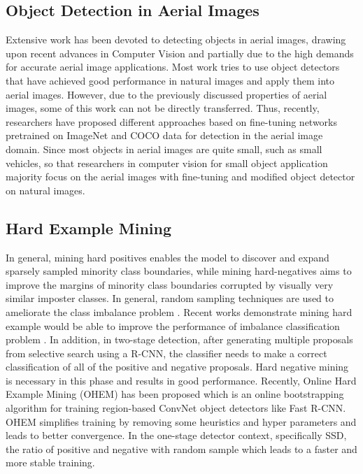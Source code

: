 \documentclass[conference]{IEEEtran}
\begin{document}
	\subsection{Object Detection in Aerial Images}
    Extensive work has been devoted to detecting objects in aerial images, drawing upon recent advances in Computer Vision and partially due to the  high demands for accurate aerial image applications. Most work tries to use object detectors that have achieved good performance in natural images and apply them into aerial images. However, due to the previously discussed properties of aerial images, some of this work can not be directly transferred. Thus, recently, researchers\cite{tang2017vehicle,sommer2017deep,yang2018automatic} have proposed different approaches based on fine-tuning networks pretrained on ImageNet\cite{deng2009imagenet} and COCO data\cite{lin2014microsoft} for detection in the aerial image domain. Since most objects in aerial images are quite small, such as small vehicles, so that researchers in computer vision for small object application majority focus on the aerial images with fine-tuning and modified object detector on natural images. 
    \subsection{Hard Example Mining}
    In general, mining hard positives enables the model to discover and expand sparsely sampled minority class boundaries, while mining hard-negatives aims to improve the margins of minority class boundaries corrupted by visually very similar imposter classes. In general, random sampling techniques are used to ameliorate the class imbalance problem \cite{provost2000machine}. Recent works demonstrate mining hard example would be able to improve the performance of imbalance classification problem \cite{dong2017class}. In addition, in two-stage detection, after generating multiple proposals from selective search using a R-CNN\cite{girshick2014rich}, the classifier needs to make a correct classification of all of the positive and negative proposals. Hard negative mining is necessary in this phase and results in good performance. Recently, Online Hard Example Mining (OHEM)\cite{shrivastava2016training} has been proposed which is an online bootstrapping algorithm for training region-based ConvNet object detectors like Fast R-CNN\cite{girshick2015fast}. OHEM simplifies training by removing some heuristics and hyper parameters and leads to better convergence. In the one-stage detector context, specifically SSD\cite{liu2016ssd}, the ratio of positive and negative with random sample which leads to a faster and more stable training.
\end{document}
